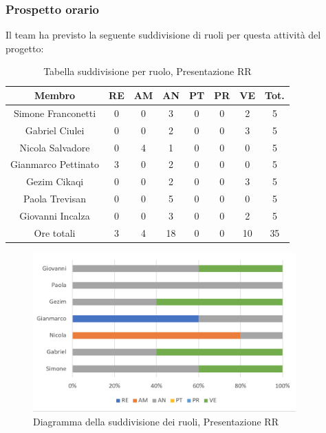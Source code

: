 \subsubsection{Prospetto orario}
Il team ha previsto la seguente suddivisione di ruoli per questa attività del progetto:
\begin{table}[h]
\caption{Tabella suddivisione per ruolo, Presentazione RR}  
\begin{center}
\begin{tabular}{ |c|c|c|c|c|c|c|c|  }
 \hline
 Membro 		& RE 	& AM 	& AN 	& PT 	& PR 	& VE 	& Tot.\\
 \hline\hline
 Simone	Franconetti		& 0 		& 0		& 3 	& 0 		& 0 		& 2 		& 5\\
 Gabriel Ciulei	& 0 		& 0 		& 2 	& 0 		& 0 		& 3 		& 5\\
 Nicola	Salvadore		& 0 		& 4 		& 1 	& 0 		& 0 		& 0 		& 5\\
 Gianmarco	Pettinato	& 3 		& 0 		& 2 	& 0 		& 0 		& 0 		& 5\\
 Gezim	Cikaqi		& 0 		& 0 		& 2 	& 0 		& 0 		& 3	 	& 5\\
 Paola	Trevisan		& 0 		& 0 		& 5 	& 0 		& 0 		& 0 		& 5\\
 Giovanni	Incalza	& 0 		& 0	 	& 3 	& 0 		& 0 		& 2  	& 5\\
 \hline\hline
 Ore totali		& 3		& 4		& 18 	& 0	 	& 0 		& 10 		& 35\\
  \hline
\end{tabular}
\end{center}
\end{table}
\begin{figure}[h!]
	\includegraphics[width=0.9\textwidth]{res/img/hi2}
	\caption{Diagramma della suddivisione dei ruoli, Presentazione RR}
\end{figure}
\newpage
